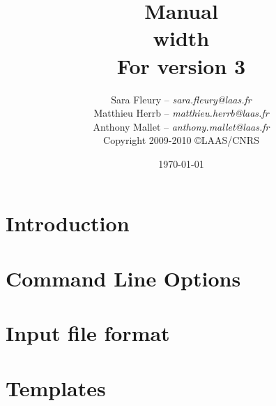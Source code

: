 \documentclass[a4paper,11pt]{book}
\title{{\Huge\bf \GenoM{} Manual}\\ \vrule height 2pt width \linewidth\\
         \hfill\small For \GenoM{} version 3}
\author{
   Sara Fleury -- {\em sara.fleury@laas.fr}\\
   Matthieu Herrb -- {\em matthieu.herrb@laas.fr}\\
   Anthony Mallet -- {\em anthony.mallet@laas.fr}\\[2em]
   Copyright 2009-2010 \copyright LAAS/CNRS
}
\date{\today}
\begin{document}

\frontmatter
\maketitle
\tableofcontents
\mainmatter

\chapter{Introduction}

\chapter{Command Line Options}
\label{chapter:clo}

\chapter{Input file format}
\label{chapter:iff}


\chapter{Templates}
\label{chapter:tmpl}
\label{section:tcl}



\end{document}
